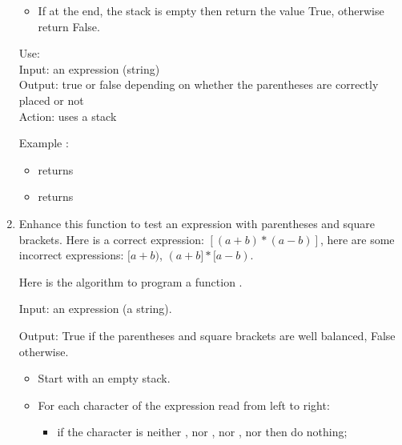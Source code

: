 \documentclass[11pt,class=report,crop=false]{standalone}
\begin{document}
\begin{activite}
\begin{enumerate}
\begin{algorithme}
\begin{itemize}
   \item If at the end, the stack is empty then return the value \og{}True\fg{}, otherwise return \og{}False\fg{}.
   
 \end{itemize}  
   \end{algorithme}


\begin{fonction}
  Use:  \\
  Input: an expression (string) \\
  Output: true or false depending on whether the parentheses are correctly placed or not \\
  Action: uses a stack
   
  \medskip
   
  Example : 
  \begin{itemize}
    \item {} returns 
    \item {} returns 
    \end{itemize}    
\end{fonction}  
  
  
\item Enhance this function to test an expression with parentheses and square brackets.
Here is a correct expression: $[(a+b)*(a-b)]$, here are some incorrect expressions:
$[a+b)$, $(a+b]*[a-b)$.

Here is the algorithm to program a function .


  \begin{algorithme}
  Input: an expression (a string). 

  Output: \og{}True\fg{} if the parentheses and square brackets are well balanced, \og{}False\fg{} otherwise.     

  \begin{itemize}

  \item Start with an empty stack.   
   
   \item For each character of the expression read from left to right:
   \begin{itemize}
     \item if the character is neither , nor , nor \ci{"["}, nor \ci{"]"} then do nothing;
     

\end{itemize}
\end{itemize}
\end{algorithme}
\end{enumerate}
\end{activite}
\end{document}
